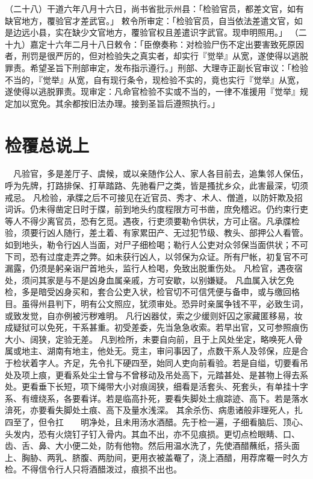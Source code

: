 \documentclass[12pt,UTF8]{ctexbook}
\begin{document}
（二十八）干道六年八月十六日，尚书省批示州县：「检验官员，都差文官，如有缺官地方，覆验官才差武官。」
敕令所审定：「检验官员，自当依法差遣文官，如是边远小县，实在缺少文官地方，覆验官权且差遣识字武官。现申明照用。」
（二十九）嘉定十六年二月十八日敕令：「臣僚奏称：对检验尸伤不定出要害致死原因者，刑罚是很严厉的，但对检验失之真实者，却实行『觉举』从宽，遂使得以逃脱罪责。希望圣旨下刑部审定，发布指示遵行。」刑部、大理寺正副长官审议：「检验不当的，『觉举』从宽，自有现行条令，现检验不实的，竟也实行『觉举』从宽，遂使得以逃脱罪责。现审定：凡命官检验不实或不当的，一律不准援用『觉举』规定加以宽免。其余都按旧法办理。接到圣旨后遵照执行。」


\chapter{检覆总说上}

　凡验官，多是差厅子、虞候，或以亲随作公人、家人各目前去，追集邻人保伍，呼为先牌，打路排保、打草踏路、先驰看尸之类，皆是搔扰乡众，此害最深，切须戒忌。
凡检验，承牒之后不可接见在近官员、秀才、术人、僧道，以防奸欺及招词诉。仍未得凿定日时于牒，前到地头约度程限方可书凿，庶免稽迟。仍约束行吏等人不得少离官员，恐有乞觅。遇夜，行吏须要勒令供状，方可止宿。凡承牒检验，须要行凶人随行，差土着、有家累田产、无过犯节级、教头、部押公人看管。如到地头，勒令行凶人当面，对尸子细检喝；勒行人公吏对众邻保当面供状；不可下司，恐有过度走弄之弊。如未获行凶人，以邻保为众证。所有尸帐，初复官不可漏露，仍须是躬亲诣尸首地头，监行人检喝，免致出脱重伤处。
凡检官，遇夜宿处，须问其家是与不是凶身血属亲戚，方可安歇，以别嫌疑。
凡血属入状乞免检，多是暗受凶身买和，套合公吏入状，检官切不可信凭便与备申，或与缴回格目。虽得州县判下，明有公文照应，犹须审处。恐异时亲属争钱不平，必致生词，或致发觉，自亦例被污秽难明。
凡行凶器仗，索之少缓则奸囚之家藏匿移易，妆成疑狱可以免死，干系甚重。初受差委，先当急急收索。若早出官，又可参照痕伤大小、阔狭，定验无差。
凡到检所，未要自向前，且于上风处坐定，略唤死人骨属或地主、湖南有地主，他处无。竞主，审问事因了，点数干系人及邻保，应是合于检状着字人。齐足，先令扎下硬四至，始同人吏向前看验。若是自缢，切要看吊处及项上痕，更看系处尘土曾与不曾移动及吊处高下，元踏甚处、是甚物上得去系处。更看垂下长短，项下绳带大小对痕阔狭，细看是活套头、死套头，有单挂十字系、有缠绕系，各要看详。若是临高扑死，要看失脚处土痕踪迹、高下。若是落水渰死，亦要看失脚处土痕、高下及量水浅深。
其余杀伤、病患诸般非理死人，扎四至了，但令扛　　明净处，且未用汤水酒醋。先于检一遍，子细看脑后、顶心、头发内，恐有火烧钉子钉入骨内。其血不出，亦不见痕损。更切点检眼睛、口、齿、舌、鼻、大小便二处，防有他物。然后用温水洗了，先使酒醋蘸纸，搭头面上、胸胁、两乳、脐腹、两肋间，更用衣被盖罨了，浇上酒醋，用荐席罨一时久方检。不得信令行人只将酒醋泼过，痕损不出也。
\end{document}
